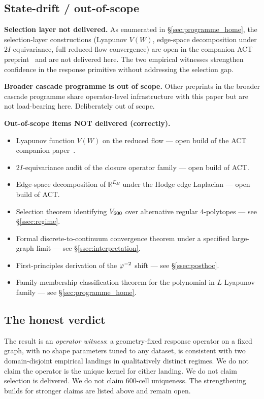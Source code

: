 \subsection{State-drift / out-of-scope}\label{ssec:scope}

\textbf{Selection layer not delivered.} As enumerated in
\S\ref{sec:programme_home}, the selection-layer constructions
(Lyapunov $V(W)$, edge-space decomposition under $2I$-equivariance,
full reduced-flow convergence) are open in the companion ACT
preprint~\citep{SmartAdaptiveClosureTransport2026} and are not
delivered here. The two empirical witnesses strengthen confidence
in the response primitive without addressing the selection gap.

\textbf{Broader cascade programme is out of scope.} Other
preprints in the broader cascade programme share operator-level
infrastructure with this paper but are not load-bearing here.
Deliberately out of scope.

\textbf{Out-of-scope items NOT delivered (correctly).}
\begin{itemize}\itemsep=2pt
\item Lyapunov function $V(W)$ on the reduced flow — open build
  of the ACT companion paper~\citep{SmartAdaptiveClosureTransport2026}.
\item $2I$-equivariance audit of the closure operator family —
  open build of ACT.
\item Edge-space decomposition of $\mathbb{R}^{E_{M}}$ under the
  Hodge edge Laplacian — open build of ACT.
\item Selection theorem identifying $V_{600}$ over alternative
  regular 4-polytopes — see \S\ref{ssec:regime}.
\item Formal discrete-to-continuum convergence theorem under a
  specified large-graph limit — see \S\ref{ssec:interpretation}.
\item First-principles derivation of the $\varphi^{-2}$ shift — see
  \S\ref{ssec:posthoc}.
\item Family-membership classification theorem for the
  polynomial-in-$L$ Lyapunov family — see \S\ref{sec:programme_home}.
\end{itemize}

\subsection{The honest verdict}

The result is an \emph{operator witness}: a geometry-fixed response
operator on a fixed graph, with no shape parameters tuned to any
dataset, is consistent with two domain-disjoint empirical landings in
qualitatively distinct regimes. We do not claim the operator is
the unique kernel for either landing. We do not claim selection is
delivered. We do not claim 600-cell uniqueness. The strengthening
builds for stronger claims are listed above and remain open.
